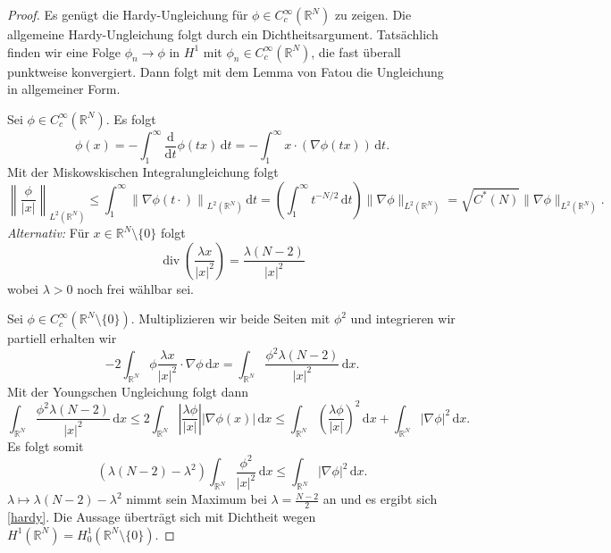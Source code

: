 \documentclass[11pt,twoside,a4paper]{article}
\theoremstyle{break}
\begin{document}
\begin{proof}
Es genügt die Hardy-Ungleichung für $\phi\in C_c^\infty(\mathbb R^N)$ zu zeigen. Die allgemeine Hardy-Ungleichung folgt durch ein Dichtheitsargument.
Tatsächlich finden wir eine Folge $\phi_n\to \phi$ in $H^1$ mit $\phi_n \in C_c^\infty(\mathbb R^N)$, die fast überall punktweise konvergiert. Dann folgt mit dem Lemma von Fatou die Ungleichung in allgemeiner Form.

Sei $\phi \in C_c^\infty(\mathbb R^N)$. Es folgt
\begin{equation}
\phi(x)=-\int_1^\infty \frac{\mathrm d}{\mathrm dt} \phi(tx) \, \mathrm dt= - \int_1^\infty x \cdot (\nabla \phi(tx))\, \mathrm dt.
\end{equation}
Mit der Miskowskischen Integralungleichung folgt
\begin{equation}
\left \| \frac{\phi}{|x|} \right \|_{L^2(\mathbb R^N)} \le \int_1^\infty \left \| \nabla \phi(t\cdot) \right \|_{L^2(\mathbb R^N)} \, \mathrm dt = \left ( \int_1^\infty t^{-N/2} \, \mathrm dt \right ) \|\nabla \phi\|_{L^2(\mathbb R^N)}=\sqrt{C^*(N)} \|\nabla\phi\|_{L^2(\mathbb R^N)}.
\end{equation}
{\it Alternativ:} Für $x\in \mathbb R^N\setminus\{0\}$ folgt
\begin{equation}
\operatorname{div} \left ( \frac{\lambda x}{|x|^2} \right ) = \frac{\lambda (N-2)}{|x|^2}
\end{equation}
wobei $\lambda>0$ noch frei wählbar sei. 

Sei $\phi \in C_c^\infty(\mathbb R^N\setminus \{0\})$. Multiplizieren wir beide Seiten mit $\phi^2$ und integrieren wir partiell erhalten wir 
\begin{equation}
-2\int_{\mathbb R^N} \phi \frac{\lambda x}{|x|^2} \cdot \nabla \phi \, \mathrm dx = \int_{\mathbb R^N} \frac{\phi^2\lambda (N-2)}{|x|^2}\, \mathrm dx.
\end{equation}
Mit der Youngschen Ungleichung folgt dann
\begin{equation}
\int_{\mathbb R^N} \frac{\phi^2\lambda (N-2)}{|x|^2} \, \mathrm dx \le 2 \int_{\mathbb R^N} \left | \frac{\lambda \phi}{|x|} \right | |\nabla \phi(x)|\, \mathrm dx \le \int_{\mathbb R^N} \left ( \frac{\lambda \phi}{|x|} \right )^2\, \mathrm dx + \int_{\mathbb R^N} |\nabla \phi|^2\, \mathrm dx.
\end{equation}
Es folgt somit
\begin{equation}
(\lambda(N-2) -\lambda^2)\int_{\mathbb R^N} \frac{\phi^2}{|x|^2}\, \mathrm dx \le \int_{\mathbb R^N} |\nabla \phi|^2\, \mathrm dx.
\end{equation}
$\lambda\mapsto \lambda(N-2)-\lambda^2$ nimmt sein Maximum bei $\lambda= \frac{N-2}{2}$ an und es ergibt sich \eqref{hardy}. Die Aussage überträgt sich mit Dichtheit wegen $H^1(\mathbb R^N) = H_0^1(\mathbb R^N\setminus\{0\})$.


\end{proof}
\end{document}
